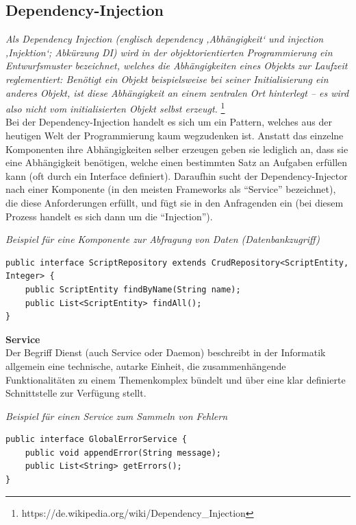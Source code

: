 \subsection{Dependency-Injection}

\emph{\glqq   
Als Dependency Injection (englisch dependency ‚Abhängigkeit‘ und injection ‚Injektion‘; Abkürzung DI) wird in der objektorientierten Programmierung ein Entwurfsmuster bezeichnet, welches die Abhängigkeiten eines Objekts zur Laufzeit reglementiert: Benötigt ein Objekt beispielsweise bei seiner Initialisierung ein anderes Objekt, ist diese Abhängigkeit an einem zentralen Ort hinterlegt – es wird also nicht vom initialisierten Objekt selbst erzeugt. \grqq} \footnote{https://de.wikipedia.org/wiki/Dependency\_Injection} \\ 

Bei der Dependency-Injection handelt es sich um ein Pattern, welches aus der heutigen Welt der Programmierung kaum wegzudenken ist. Anstatt das einzelne Komponenten ihre Abhängigkeiten selber erzeugen geben sie lediglich an, dass sie eine Abhängigkeit benötigen, welche einen bestimmten Satz an Aufgaben erfüllen kann (oft durch ein Interface definiert). Daraufhin sucht der Dependency-Injector nach einer Komponente (in den meisten Frameworks als ``Service'' bezeichnet), die diese Anforderungen erfüllt, und fügt sie in den Anfragenden ein (bei diesem Prozess handelt es sich dann um die ``Injection''). \\

\begin{minipage}{\textwidth}
\emph{Beispiel für eine Komponente zur Abfragung von Daten (Datenbankzugriff)}
\begin{lstlisting}
public interface ScriptRepository extends CrudRepository<ScriptEntity, Integer> {
	public ScriptEntity findByName(String name);
	public List<ScriptEntity> findAll();
}
\end{lstlisting} 
\end{minipage}

\newpage
\textbf{Service}\\
Der Begriff Dienst (auch Service oder Daemon) beschreibt in der Informatik allgemein eine technische, autarke Einheit, die zusammenhängende Funktionalitäten zu einem Themenkomplex bündelt und über eine klar definierte Schnittstelle zur Verfügung stellt.\\
 
\begin{minipage}{\textwidth}
\emph{Beispiel für einen Service zum Sammeln von Fehlern}
\begin{lstlisting}
public interface GlobalErrorService {
	public void appendError(String message);
	public List<String> getErrors();
}
\end{lstlisting}
\end{minipage}

